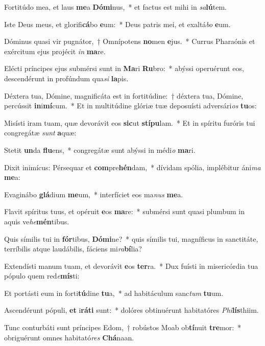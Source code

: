 \item Fortitúdo mea, et laus \textbf{me}a \textbf{Dó}\textbf{mi}nus,~* et factus est mihi in \textit{sa}\textbf{lú}tem.
\item Iste Deus meus, et glorifi\textbf{cá}bo \textbf{e}um:~* Deus patris mei, et exaltá\textit{bo} \textbf{e}um.
\item Dóminus quasi vir pugnátor,~† Omnípotens \textbf{no}men \textbf{e}jus.~* Currus Pharaónis et exércitum ejus projécit \textit{in} \textbf{ma}re.
\item Elécti príncipes ejus submérsi sunt in \textbf{Ma}ri \textbf{Ru}bro:~* abýssi operuérunt eos, descendérunt in profúndum qua\textit{si} \textbf{la}pis.
\item Déxtera tua, Dómine, magnificáta est in fortitúdine:~† déxtera tua, Dómine, percússit \textbf{in}i\textbf{mí}cum.~* Et in multitúdine glóriæ tuæ deposuísti adversári\textit{os} \textbf{tu}os:
\item Misísti iram tuam, quæ devorávit eos \textbf{sic}ut \textbf{stí}\textbf{pu}lam.~* Et in spíritu furóris tui congregátæ \textit{sunt} \textbf{a}quæ:
\item Stetit \textbf{un}da \textbf{flu}ens,~* congregátæ sunt abýssi in médi\textit{o} \textbf{ma}ri.
\item Dixit inimícus: Pérsequar et \textbf{com}pre\textbf{hén}dam,~* dívidam spólia, implébitur áni\textit{ma} \textbf{me}a:
\item Evaginábo \textbf{glá}dium \textbf{me}um,~* interfíciet eos ma\textit{nus} \textbf{me}a.
\item Flavit spíritus tuus, et opéruit \textbf{e}os \textbf{ma}re:~* submérsi sunt quasi plumbum in aquis ve\textit{he}\textbf{mén}tibus.
\item Quis símilis tui in \textbf{fór}tibus, \textbf{Dó}\textbf{mi}ne?~* quis símilis tui, magníficus in sanctitáte, terríbilis atque laudábilis, fáciens mi\textit{ra}\textbf{bí}lia?
\item Extendísti manum tuam, et devorávit \textbf{e}os \textbf{ter}ra.~* Dux fuísti in misericórdia tua pópulo quem red\textit{e}\textbf{mís}ti:
\item Et portásti eum in forti\textbf{tú}dine \textbf{tu}a,~* ad habitáculum sanc\textit{tum} \textbf{tu}um.
\item Ascendérunt pópuli, \textbf{et} i\textbf{rá}\textbf{ti} sunt:~* dolóres obtinuérunt habitatóres \textit{Phi}\textbf{lís}thiim.
\item Tunc conturbáti sunt príncipes Edom,~† robústos Moab ob\textbf{tí}nuit \textbf{tre}mor:~* obriguérunt omnes habitató\textit{res} \textbf{Chá}naan.
